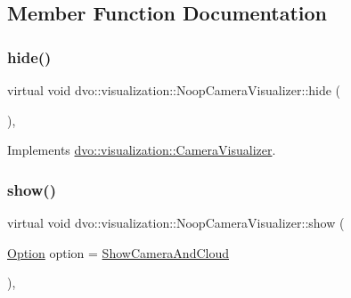 \subsection{Member Function Documentation}
\mbox{\label{classdvo_1_1visualization_1_1_noop_camera_visualizer_a875ff591e3db513ddbec48478989639e}} 
\subsubsection{\texorpdfstring{hide()}{hide()}}
{\footnotesize\ttfamily virtual void dvo\+::visualization\+::\+Noop\+Camera\+Visualizer\+::hide (\begin{DoxyParamCaption}{ }\end{DoxyParamCaption})\hspace{0.3cm}{\ttfamily [inline]}, {\ttfamily [virtual]}}



Implements \mbox{\hyperlink{classdvo_1_1visualization_1_1_camera_visualizer_a45dbf0d449a7b7529f7da477c676ca85}{dvo\+::visualization\+::\+Camera\+Visualizer}}.

\mbox{\label{classdvo_1_1visualization_1_1_noop_camera_visualizer_acfb97efacfcb9e3dd30444e34c7bfd9c}} 
\subsubsection{\texorpdfstring{show()}{show()}}
{\footnotesize\ttfamily virtual void dvo\+::visualization\+::\+Noop\+Camera\+Visualizer\+::show (\begin{DoxyParamCaption}\item[{\mbox{\hyperlink{classdvo_1_1visualization_1_1_camera_visualizer_a0526f50be9f298c4f7d1f91018d50af7}{Option}}}]{option = {\ttfamily \mbox{\hyperlink{classdvo_1_1visualization_1_1_camera_visualizer_a0526f50be9f298c4f7d1f91018d50af7a0ff8fc7d7283f27066e93ca0d4ef3f19}{Show\+Camera\+And\+Cloud}}} }\end{DoxyParamCaption})\hspace{0.3cm}{\ttfamily [inline]}, {\ttfamily [virtual]}}



